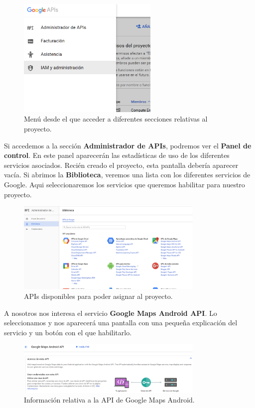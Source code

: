 \begin{figure}[H]
\centering
  \includegraphics[width=0.6\textwidth]{Figures/anexo/google_api/menu_console}
  \caption{Menú desde el que acceder a diferentes secciones relativas al proyecto.}
\end{figure}

Si accedemos a la sección \textbf{Administrador de APIs}, podremos ver el \textbf{Panel de control}. En este panel aparecerán las estadísticas de uso de los diferentes servicios asociados. Recién creado el proyecto, esta pantalla debería aparecer vacía. Si abrimos la \textbf{Biblioteca}, veremos una lista con los diferentes servicios de Google. Aqui seleccionaremos los servicios que queremos habilitar para nuestro proyecto.

\begin{figure}[H]
\centering
  \includegraphics[width=0.8\textwidth]{Figures/anexo/google_api/api_library}
  \caption{APIs disponibles para poder asignar al proyecto.}
\end{figure}

A nosotros nos interesa el servicio \textbf{Google Maps Android API}. Lo seleccionamos y nos aparecerá una pantalla con una pequeña explicación del servicio y un botón con el que habilitarlo.

\begin{figure}[H]
\centering
  \includegraphics[width=0.8\textwidth]{Figures/anexo/google_api/api_google_map}
  \caption{Información relativa a la API de Google Maps Android.}
\end{figure}

